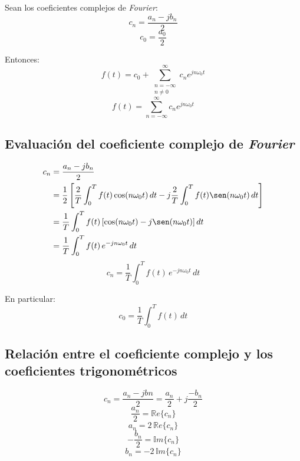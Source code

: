 Sean los coeficientes complejos de \emph{Fourier}:
\begin{equation*}
    c_n=\frac{a_n-jb_n}{2}
\end{equation*}
\begin{equation*}
    c_0=\frac{a_0}{2}
\end{equation*}

Entonces:
\begin{equation*}
    f(t)=c_0+\sum_{\substack{n=-\infty\\n\neq0}}^{\infty}c_n e^{jn\omega_0 t}
\end{equation*}
\begin{equation}
    f(t)=\sum_{n=-\infty}^{\infty}c_n e^{jn\omega_0 t}
\end{equation}

\subsection{Evaluación del coeficiente complejo de \emph{Fourier}}
\begin{equation*}
\begin{split}
    c_n
        &=\frac{a_n-jb_n}{2}\\
        &=\frac{1}{2}\left[
            \frac{2}{T}\int_0^T f(t)\cos(n\omega_0 t)\,dt
            -j\frac{2}{T}\int_0^T f(t)\sen(n\omega_0 t)\,dt
        \right]\\
        &=\frac{1}{T}\int_0^T f(t)\left[
            \cos(n\omega_0 t)-j\sen(n\omega_0 t)
        \right]dt\\
        &=\frac{1}{T}\int_0^T f(t)\,e^{-jn\omega_0 t}\,dt\\
\end{split}
\end{equation*}
\begin{equation}
    c_n=\frac{1}{T}\int_0^T f(t)\,e^{-jn\omega_0 t}\,dt
\end{equation}

En particular:
\begin{equation}
    c_0=\frac{1}{T}\int_0^T f(t)\,dt
\end{equation}

\subsection{Relación entre el coeficiente complejo y los coeficientes
trigonométricos}
\begin{equation*}
    c_n=\frac{a_n-jbn}{2}
        =\frac{a_n}{2}+j\frac{-b_n}{2}
\end{equation*}
\begin{equation*}
    \frac{a_n}{2}=\mathbb{R}e\{c_n\}
\end{equation*}
\begin{equation}
    a_n=2\,\mathbb{R}e\{c_n\}
\end{equation}
\begin{equation*}
    -\frac{b_n}{2}=\mathbb{I}m\{c_n\}
\end{equation*}
\begin{equation}
    b_n=-2\,\mathbb{I}m\{c_n\}
\end{equation}

